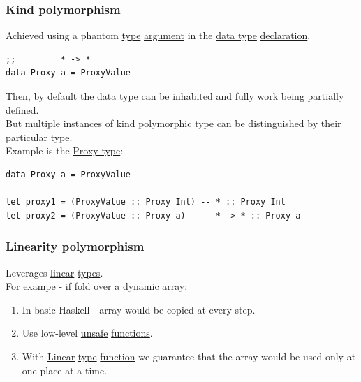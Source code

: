 \documentclass[11pt]{article}
\begin{document}
\subsubsection{\label{orgfc8b4e2}Kind polymorphism}
\label{sec:org67452f8}
Achieved using a phantom \hyperref[orgc4aea2f]{type} \hyperref[orga6b7e97]{argument} in the \hyperref[org212d9c3]{data type} \hyperref[org8fbd848]{declaration}.\\
\begin{verbatim}
;;         * -> *
data Proxy a = ProxyValue
\end{verbatim}
Then, by default the \hyperref[org212d9c3]{data type} can be inhabited and fully work being partially defined.\\
But multiple instances of \hyperref[orgd0eb143]{kind} \hyperref[orgac4d581]{polymorphic} \hyperref[orgc4aea2f]{type} can be distinguished by their particular \hyperref[orgc4aea2f]{type}.\\

Example is the \hyperref[orgd50d098]{Proxy type}:\\
\begin{verbatim}
data Proxy a = ProxyValue

let proxy1 = (ProxyValue :: Proxy Int) -- * :: Proxy Int
let proxy2 = (ProxyValue :: Proxy a)   -- * -> * :: Proxy a
\end{verbatim}

\subsubsection{\label{org13a4051}Linearity polymorphism}
\label{sec:org49b8262}
Leverages \hyperref[orgbbe89e9]{linear} \hyperref[org4209edd]{types}.\\
For exampe - if \hyperref[org2e54a0f]{fold} over a dynamic array:\\
\begin{enumerate}
\item In basic Haskell - array would be copied at every step.\\
\item Use low-level \hyperref[org8ae67d0]{unsafe} \hyperref[orgaa8fb87]{functions}.\\
\item With \hyperref[orgbbe89e9]{Linear} \hyperref[orgc4aea2f]{type} \hyperref[orge15bc14]{function} we guarantee that the array would be used only at one place at a time.\\
\end{enumerate}
\end{document}
